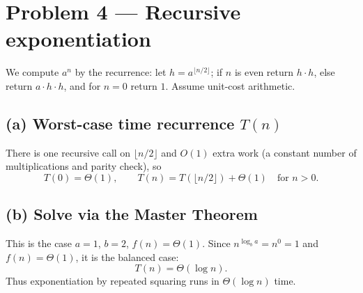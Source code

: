 \section*{Problem 4 — Recursive exponentiation}

We compute $a^n$ by the recurrence: let $h=a^{\lfloor n/2\rfloor}$; if $n$ is even return $h\cdot h$, else return $a\cdot h\cdot h$, and for $n=0$ return $1$. Assume unit-cost arithmetic.

\subsection*{(a) Worst-case time recurrence $T(n)$}
There is one recursive call on $\lfloor n/2\rfloor$ and $O(1)$ extra work (a constant number of multiplications and parity check), so
\[
T(0)=\Theta(1),\qquad T(n)=T(\lfloor n/2\rfloor)+\Theta(1)\quad\text{for }n>0.
\]

\subsection*{(b) Solve via the Master Theorem}
This is the case $a=1$, $b=2$, $f(n)=\Theta(1)$. Since $n^{\log_b a}=n^{0}=1$ and $f(n)=\Theta(1)$, it is the balanced case:
\[
T(n)=\Theta(\log n).
\]
Thus exponentiation by repeated squaring runs in $\Theta(\log n)$ time.
